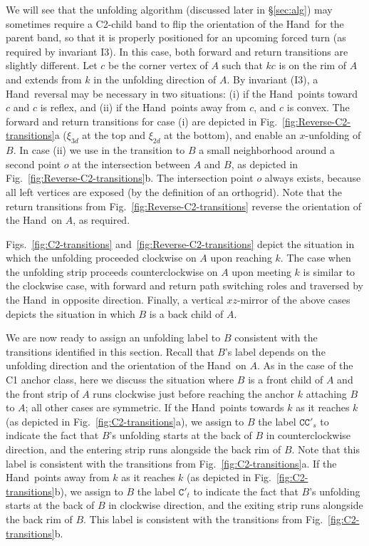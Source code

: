 \documentclass[11pt]{article}
\def\c{\mathtt{C}}
\def\cc{\mathtt{CC}}
\newcommand\hand{{\sc Hand}}
\begin{document}
We will see that the unfolding algorithm (discussed later in \S\ref{sec:alg}) may sometimes require a C2-child band to flip the orientation of the \hand\ for the parent band, so that it is properly positioned for an upcoming forced turn (as required by invariant I3). In this case, both forward and return transitions are slightly different. Let $c$ be the corner vertex of $A$ such that $kc$ is on the rim of $A$ and extends from $k$ in the unfolding direction of $A$. By invariant (I3), a \hand\ reversal may be necessary in two situations: (i) if the \hand\ points toward $c$ and $c$ is reflex, and (ii) if the \hand\ points away from $c$, and $c$ is convex. The forward and return transitions for case (i) are depicted in Fig.~\ref{fig:Reverse-C2-transitions}a ($\xi_{3d}$ at the top and $\xi_{2d}$ at the bottom), and enable an $x$-unfolding of $B$. In case (ii) we use in the transition to $B$ a small neighborhood around a second point $o$ at the intersection between $A$ and $B$, as depicted in Fig.~\ref{fig:Reverse-C2-transitions}b. The intersection point $o$ always exists, because all left vertices are exposed (by the definition of an orthogrid). 
Note that the return transitions from Fig.~\ref{fig:Reverse-C2-transitions} reverse the orientation of the \hand\ on $A$, as required.

Figs.~\ref{fig:C2-transitions} and~\ref{fig:Reverse-C2-transitions} depict the situation in which the unfolding proceeded clockwise on $A$ upon reaching $k$.
The case when the unfolding strip proceeds counterclockwise on $A$ upon meeting $k$ is similar to the clockwise case, with forward and return path switching roles and traversed by the \hand\ in opposite direction. 
Finally, a vertical $xz$-mirror of the above cases depicts the situation in which $B$ is a back child of $A$.

We are now ready to assign an unfolding label to $B$ consistent with the transitions identified in this section. Recall that $B$'s label depends on the unfolding direction and the orientation of the \hand\ on $A$. As in the case of the C1 anchor class, here we discuss the situation where  $B$ is a front child of $A$ and the front strip of $A$ runs clockwise just before reaching the anchor $k$ attaching $B$ to $A$; all other cases are symmetric. If the \hand\ points towards $k$ as it reaches $k$ (as depicted in Fig.~\ref{fig:C2-transitions}a), we assign to $B$ the label $\cc'_{s}$ to indicate the fact that $B$'s unfolding starts at the back of $B$ in counterclockwise direction, and the entering strip runs alongside the back rim of $B$. Note that this label is consistent with the transitions from Fig.~\ref{fig:C2-transitions}a. If the \hand\ points away from $k$ as it reaches $k$ (as depicted in Fig.~\ref{fig:C2-transitions}b), we assign to $B$ the label $\c'_{t}$ to indicate the fact that $B$'s unfolding starts at the back of $B$ in clockwise direction, and the exiting strip runs alongside the back rim of $B$.  This label is consistent with  the transitions from Fig.~\ref{fig:C2-transitions}b.
\end{document}

